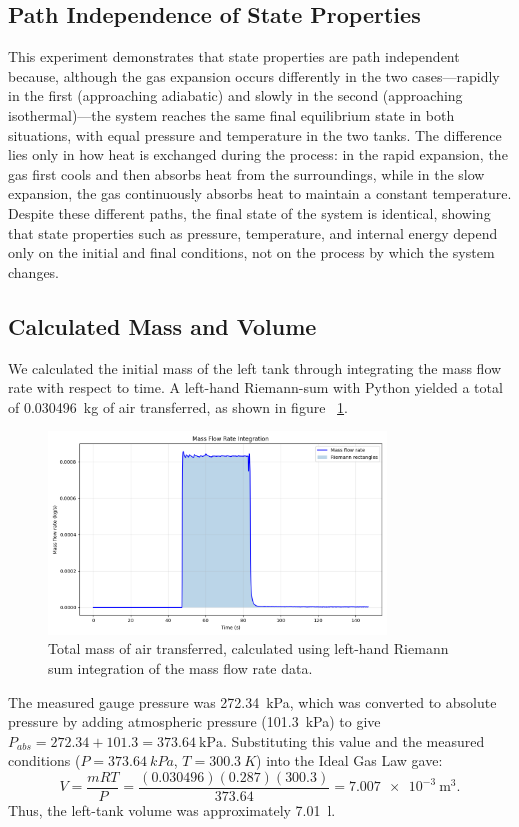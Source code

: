 \documentclass[12pt]{article}
\begin{document}
\subsection*{Path Independence of State Properties}
This experiment demonstrates that state properties are path independent because, although the gas expansion occurs differently in the two cases—rapidly in the first (approaching adiabatic) and slowly in the second (approaching isothermal)—the system reaches the same final equilibrium state in both situations, with equal pressure and temperature in the two tanks. The difference lies only in how heat is exchanged during the process: in the rapid expansion, the gas first cools and then absorbs heat from the surroundings, while in the slow expansion, the gas continuously absorbs heat to maintain a constant temperature. Despite these different paths, the final state of the system is identical, showing that state properties such as pressure, temperature, and internal energy depend only on the initial and final conditions, not on the process by which the system changes.

\subsection*{Calculated Mass and Volume}

We calculated the initial mass of the left tank through integrating the mass flow rate with respect to time. A left-hand Riemann-sum with Python \cite{integrate_script} yielded a total of \SI{0.030496}{\kilogram} of air transferred, as shown in figure ~\ref{fig:massintegration}.
\begin{figure}[h!]
\centering
\includegraphics[width=0.8\textwidth]{massintegration.png}
\caption{Total mass of air transferred, calculated using left-hand Riemann sum integration of the mass flow rate data.}
\label{fig:massintegration}
\end{figure}
The measured gauge pressure was \SI{272.34}{\kPa}, which was converted to absolute pressure by adding atmospheric pressure (\SI{101.3}{\kPa}) to give \(P_{abs} = 272.34 + 101.3 = \SI{373.64}{\kPa}\). Substituting this value and the measured conditions (\(P = 373.64~\si{kPa}\), \(T = 300.3~\si{K}\)) into the Ideal Gas Law gave:
\[
V = \frac{mRT}{P} =
\frac{(0.030496)(0.287)(300.3)}{373.64} =
\SI{7.007e-3}{\metre\cubed}.
\]
Thus, the left-tank volume was approximately \SI{7.01}{\litre}.
\end{document}
